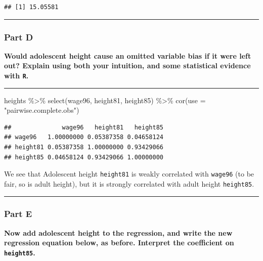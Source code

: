 \documentclass[
]{article}
\newenvironment{Shaded}{\begin{snugshade}}{\end{snugshade}}
\newcommand{\AttributeTok}[1]{\textcolor[rgb]{0.77,0.63,0.00}{#1}}
\newcommand{\FunctionTok}[1]{\textcolor[rgb]{0.00,0.00,0.00}{#1}}
\newcommand{\NormalTok}[1]{#1}
\newcommand{\SpecialCharTok}[1]{\textcolor[rgb]{0.00,0.00,0.00}{#1}}
\newcommand{\StringTok}[1]{\textcolor[rgb]{0.31,0.60,0.02}{#1}}
\begin{document}
\begin{verbatim}
## [1] 15.05581
\end{verbatim}

\begin{center}\rule{0.5\linewidth}{0.5pt}\end{center}

\hypertarget{part-d-2}{%
\subsubsection{Part D}\label{part-d-2}}

\textbf{Would adolescent height cause an omitted variable bias if it
were left out? Explain using both your intuition, and some statistical
evidence with \texttt{R}.}

\begin{center}\rule{0.5\linewidth}{0.5pt}\end{center}

\begin{Shaded}
\begin{Highlighting}[]
\NormalTok{heights }\SpecialCharTok{\%\textgreater{}\%}
  \FunctionTok{select}\NormalTok{(wage96, height81, height85) }\SpecialCharTok{\%\textgreater{}\%}
  \FunctionTok{cor}\NormalTok{(}\AttributeTok{use =} \StringTok{"pairwise.complete.obs"}\NormalTok{)}
\end{Highlighting}
\end{Shaded}

\begin{verbatim}
##              wage96   height81   height85
## wage96   1.00000000 0.05387358 0.04658124
## height81 0.05387358 1.00000000 0.93429066
## height85 0.04658124 0.93429066 1.00000000
\end{verbatim}

We see that Adolescent height \texttt{height81} is weakly correlated
with \texttt{wage96} (to be fair, so is adult height), but it is
strongly correlated with adult height \texttt{height85}.

\begin{center}\rule{0.5\linewidth}{0.5pt}\end{center}

\hypertarget{part-e-1}{%
\subsubsection{Part E}\label{part-e-1}}

\textbf{Now add adolescent height to the regression, and write the new
regression equation below, as before. Interpret the coefficient on
\texttt{height85}.}
\end{document}
